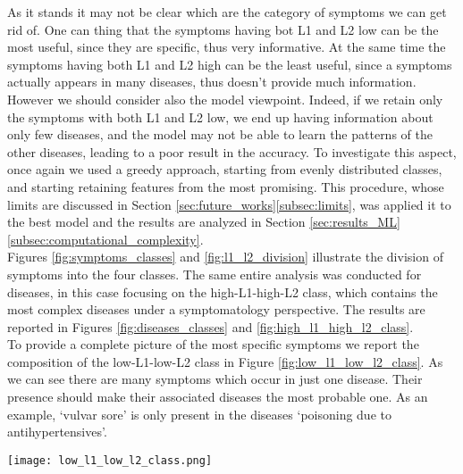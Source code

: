 \noindent
As it stands it may not be clear which are the category of symptoms we can get rid of. One can thing that the symptoms having bot L1
and L2 low can be the most useful, since they are specific, thus very informative. At the same time the symptoms having both L1 and L2 high
can be the least useful, since a symptoms actually appears in many diseases, thus doesn't provide much information.
However we should consider also the model viewpoint. Indeed, if we retain only the symptoms with both L1 and L2 low, we end up
having information about only few diseases, and the model may not be able to learn the patterns of the other diseases, leading
to a poor result in the accuracy. To investigate this aspect, once again we used a greedy approach, starting from evenly distributed
classes, and starting retaining features from the most promising. This procedure, whose limits are discussed in
Section \ref{sec:future_works}\ref{subsec:limits}, was applied it to the best model and the results are analyzed in 
Section \ref{sec:results_ML}\ref{subsec:computational_complexity}.\\
Figures \ref{fig:symptoms_classes} and \ref{fig:l1_l2_division} illustrate the division of symptoms into the four classes.
The same entire analysis was conducted for diseases, in this case focusing on the high-L1-high-L2 class, which contains
the most complex diseases under a symptomatology perspective. The results are reported in Figures \ref{fig:diseases_classes}
and \ref{fig:high_l1_high_l2_class}.\\
To provide a complete picture of the most specific symptoms we report the composition of the low-L1-low-L2 class
in Figure \ref{fig:low_l1_low_l2_class}. As we can see there are many symptoms which occur in just one disease.
Their presence should make their associated diseases the most probable one. As an example, `vulvar sore'
is only present in the diseases `poisoning due to antihypertensives'.\\

\begin{figure*}[!t]
    \centering
    \texttt{[image: low\_l1\_low\_l2\_class.png]}
    \caption{Composition of the low-L1-low-L2 class for symptoms}\label{fig:low_l1_low_l2_class}
\end{figure*}






